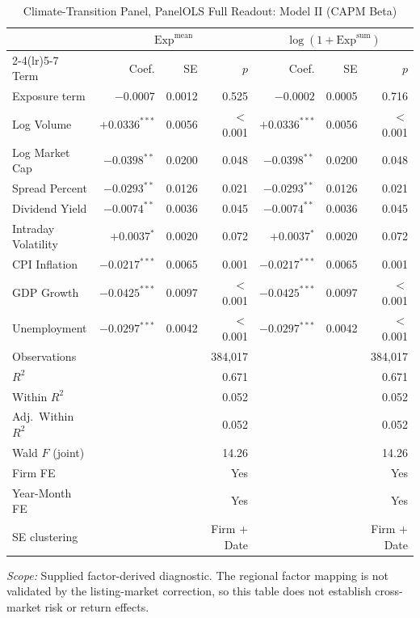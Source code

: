 \begin{table}[htbp]
\centering
\caption{Climate-Transition Panel, PanelOLS Full Readout: Model II (CAPM Beta)}
\label{tab:v2_full_modelII}
\begin{threeparttable}
\small
\setlength{\tabcolsep}{4pt}
\begin{tabular}{l r r r r r r}
\toprule
 & \multicolumn{3}{c}{$\mathrm{Exp}^{\text{mean}}$} & \multicolumn{3}{c}{$\log(1+\mathrm{Exp}^{\text{sum}})$} \\
\cmidrule(lr){2-4}\cmidrule(lr){5-7}
Term & Coef. & SE & $p$ & Coef. & SE & $p$ \\
\midrule
Exposure term & $-0.0007$ & 0.0012 & 0.525 & $-0.0002$ & 0.0005 & 0.716 \\
Log Volume & $+0.0336^{***}$ & 0.0056 & $<$0.001 & $+0.0336^{***}$ & 0.0056 & $<$0.001 \\
Log Market Cap & $-0.0398^{**}$ & 0.0200 & 0.048 & $-0.0398^{**}$ & 0.0200 & 0.048 \\
Spread Percent & $-0.0293^{**}$ & 0.0126 & 0.021 & $-0.0293^{**}$ & 0.0126 & 0.021 \\
Dividend Yield & $-0.0074^{**}$ & 0.0036 & 0.045 & $-0.0074^{**}$ & 0.0036 & 0.045 \\
Intraday Volatility & $+0.0037^{*}$ & 0.0020 & 0.072 & $+0.0037^{*}$ & 0.0020 & 0.072 \\
CPI Inflation & $-0.0217^{***}$ & 0.0065 & 0.001 & $-0.0217^{***}$ & 0.0065 & 0.001 \\
GDP Growth & $-0.0425^{***}$ & 0.0097 & $<$0.001 & $-0.0425^{***}$ & 0.0097 & $<$0.001 \\
Unemployment & $-0.0297^{***}$ & 0.0042 & $<$0.001 & $-0.0297^{***}$ & 0.0042 & $<$0.001 \\
\midrule
Observations & & & 384,017 & & & 384,017 \\
$R^2$ & & & 0.671 & & & 0.671 \\
Within $R^2$ & & & 0.052 & & & 0.052 \\
Adj.\ Within $R^2$ & & & 0.052 & & & 0.052 \\
Wald $F$ (joint) & & & 14.26 & & & 14.26 \\
Firm FE & & & Yes & & & Yes \\
Year-Month FE & & & Yes & & & Yes \\
SE clustering & & & Firm $+$ Date & & & Firm $+$ Date \\
\bottomrule
\end{tabular}
\begin{tablenotes}
\small
\item \textit{Scope:} Supplied factor-derived diagnostic. The regional factor mapping is not validated by the listing-market correction, so this table does not establish cross-market risk or return effects.\par

\end{tablenotes}
\end{threeparttable}
\end{table}
